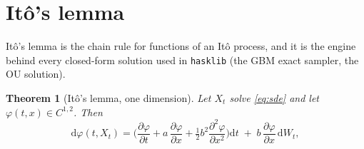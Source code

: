 \documentclass[11pt]{article}
\newcommand{\dd}{\mathrm{d}}           %
\newcommand{\dW}{\dd W_t}              %
\newcommand{\dt}{\dd t}                %
\newcommand{\drift}{a}                 %
\newcommand{\diff}{b}                  %
\theoremstyle{plain}
\newtheorem{theorem}{Theorem}
\theoremstyle{definition}
\theoremstyle{remark}
\begin{document}
\section{It\^o's lemma}

It\^o's lemma is the chain rule for functions of an It\^o process, and
it is the engine behind every closed-form solution used in
\texttt{hasklib} (the GBM exact sampler, the OU solution).

\begin{theorem}[It\^o's lemma, one dimension]\label{thm:ito}
Let $X_t$ solve \eqref{eq:sde} and let $\varphi(t,x)\in C^{1,2}$. Then
\begin{equation}\label{eq:ito}
   \dd \varphi(t,X_t) =
     \Big( \frac{\partial\varphi}{\partial t} + \drift\, \frac{\partial\varphi}{\partial x} + \tfrac12 \diff^2 \frac{\partial^2\varphi}{\partial x^2} \Big)\dt
     \;+\; \diff\, \frac{\partial\varphi}{\partial x} \,\dW,
\end{equation}
\end{theorem}
\end{document}
